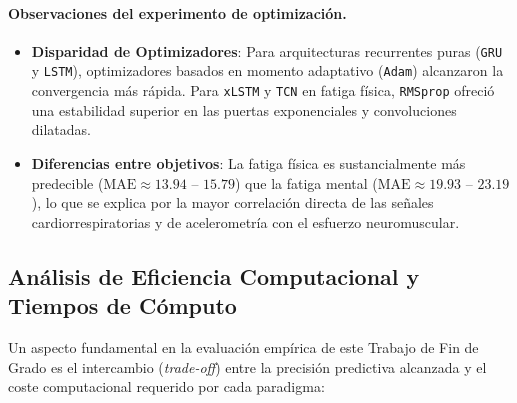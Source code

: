\documentclass[12pt, a4paper]{article}
\newcommand{\code}[1]{\texttt{#1}}
\begin{document}
\paragraph{Observaciones del experimento de optimización.}
\begin{itemize}
    \item \textbf{Disparidad de Optimizadores}: Para arquitecturas recurrentes puras (\code{GRU} y \code{LSTM}), optimizadores basados en momento adaptativo (\code{Adam}) alcanzaron la convergencia más rápida. Para \code{xLSTM} y \code{TCN} en fatiga física, \code{RMSprop} ofreció una estabilidad superior en las puertas exponenciales y convoluciones dilatadas.
    \item \textbf{Diferencias entre objetivos}: La fatiga física es sustancialmente más predecible ($\text{MAE} \approx 13.94$ -- $15.79$) que la fatiga mental ($\text{MAE} \approx 19.93$ -- $23.19$), lo que se explica por la mayor correlación directa de las señales cardiorrespiratorias y de acelerometría con el esfuerzo neuromuscular.
\end{itemize}

\subsection{Análisis de Eficiencia Computacional y Tiempos de Cómputo}
\label{sec:tiempos_computo}

Un aspecto fundamental en la evaluación empírica de este Trabajo de Fin de Grado es el intercambio (\textit{trade-off}) entre la precisión predictiva alcanzada y el coste computacional requerido por cada paradigma:
\end{document}
